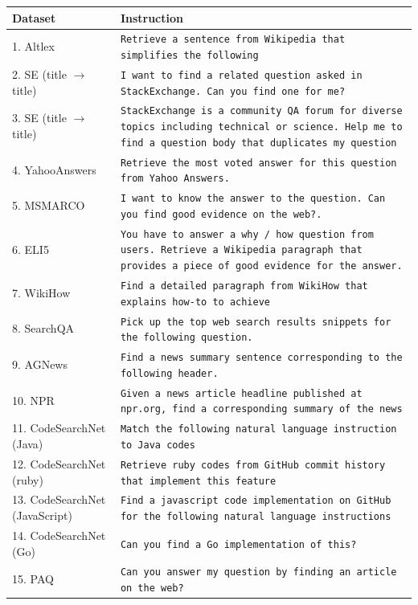 \begin{table}[t!]
\renewcommand{\arraystretch}{1.2}
\setlength{\tabcolsep}{2pt}
\footnotesize
    \centering
    \begin{tabular}{lp{12cm}}%
\toprule
\textbf{Dataset} & \textbf{Instruction} \\\midrule
1. Altlex &  \texttt{Retrieve a sentence from Wikipedia that simplifies the following} \\
2. SE (title $\rightarrow$ title) &  \texttt{I want to find a related question asked in StackExchange. Can you find one for me?} \\
3. SE (title $\rightarrow$ title) &  \texttt{StackExchange is a community QA forum for diverse topics including technical or science. Help me to find a question body that duplicates my question} \\
4. YahooAnswers &  \texttt{Retrieve the most voted answer for this question from Yahoo Answers.} \\
5. MSMARCO &  \texttt{I want to know the answer to the question. Can you find good evidence on the web?.} \\
6. ELI5 &  \texttt{You have to answer a why / how question from users. Retrieve a Wikipedia paragraph that provides a piece of good evidence for the answer.} \\
7. WikiHow & \texttt{Find a detailed paragraph from WikiHow that explains how-to to achieve} \\
8. SearchQA &\texttt{Pick up the top web search results snippets for the following question.} \\
9. AGNews &\texttt{Find a news summary sentence corresponding to the following header.} \\
10. NPR & \texttt{Given a news article headline published at npr.org, find a corresponding summary of the news} \\
11. CodeSearchNet (Java) & \texttt{Match the following natural language instruction to Java codes} \\
12. CodeSearchNet (ruby) & \texttt{Retrieve ruby codes from GitHub commit history that implement this feature} \\
13. CodeSearchNet (JavaScript) & \texttt{Find a javascript code implementation on GitHub for the following natural language instructions} \\
14. CodeSearchNet (Go) & \texttt{Can you find a Go implementation of this?} \\
15. PAQ & \texttt{Can you answer my question by finding an article on the web?} \\

\end{tabular}
\end{table}
